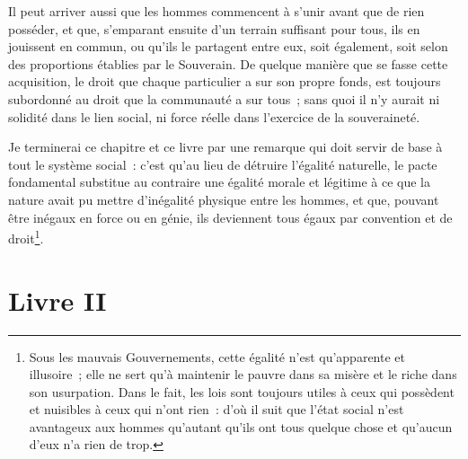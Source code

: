 \documentclass[french,twoside]{book} %
\begin{document}
Il peut arriver aussi que les hommes commencent à s’unir avant que de rien posséder, et que, s’emparant ensuite d’un terrain suffisant pour tous, ils en jouissent en commun, ou qu’ils le partagent entre eux, soit également, soit selon des proportions établies par le Souverain. De quelque manière que se fasse cette acquisition, le droit que chaque particulier a sur son propre fonds, est toujours subordonné au droit que la communauté a sur tous ; sans quoi il n’y aurait ni solidité dans le lien social, ni force réelle dans l’exercice de la souveraineté.\par
Je terminerai ce chapitre et ce livre par une remarque qui doit servir de base à tout le système social : c’est qu’au lieu de détruire l’égalité naturelle, le pacte fondamental substitue au contraire une égalité morale et légitime à ce que la nature avait pu mettre d’inégalité physique entre les hommes, et que, pouvant être inégaux en force ou en génie, ils deviennent tous égaux par convention et de droit\footnote{Sous les mauvais Gouvernements, cette égalité n’est qu’apparente et illusoire ; elle ne sert qu’à maintenir le pauvre dans sa misère et le riche dans son usurpation. Dans le fait, les lois sont toujours utiles à ceux qui possèdent et nuisibles à ceux qui n’ont rien : d’où il suit que l’état social n’est avantageux aux hommes qu’autant qu’ils ont tous quelque chose et qu’aucun d’eux n’a rien de trop.}.
\section[{Livre II}]{Livre II}\renewcommand{\leftmark}{Livre II}
\end{document}
